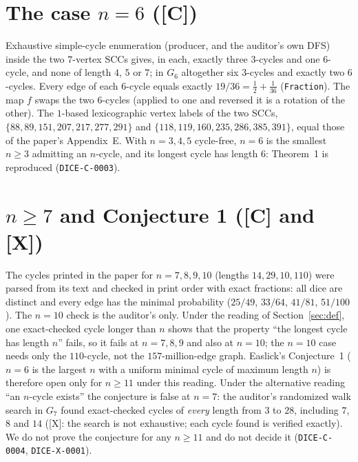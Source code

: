 \documentclass[10pt]{article}
\newcommand{\tier}[1]{\textsf{[#1]}}
\newcommand{\tC}{\tier{C}}
\newcommand{\tX}{\tier{X}}
\begin{document}
\section{The case $n=6$ (\tC{})}\label{sec:six}
Exhaustive simple-cycle enumeration (producer, and the auditor's own DFS) inside the two $7$-vertex SCCs gives, in each, exactly three $3$-cycles and one $6$-cycle, and none of length $4$, $5$ or $7$; in $G_6$ altogether six $3$-cycles and exactly two $6$-cycles. Every edge of each $6$-cycle equals exactly $19/36=\tfrac12+\tfrac1{36}$ (\texttt{Fraction}). The map $f$ swaps the two $6$-cycles (applied to one and reversed it is a rotation of the other). The $1$-based lexicographic vertex labels of the two SCCs, $\{88,89,151,207,217,277,291\}$ and $\{118,119,160,235,286,385,391\}$, equal those of the paper's Appendix~E. With $n=3,4,5$ cycle-free, $n=6$ is the smallest $n\ge3$ admitting an $n$-cycle, and its longest cycle has length $6$: Theorem~1 is reproduced (\texttt{DICE-C-0003}).

\section{$n\ge7$ and Conjecture 1 (\tC{} and \tX{})}\label{sec:big}
The cycles printed in the paper for $n=7,8,9,10$ (lengths $14,29,10,110$) were parsed from its text and checked in print order with exact fractions: all dice are distinct and every edge has the minimal probability ($25/49$, $33/64$, $41/81$, $51/100$). The $n=10$ check is the auditor's only. Under the reading of Section~\ref{sec:def}, one exact-checked cycle longer than $n$ shows that the property ``the longest cycle has length $n$'' fails, so it fails at $n=7,8,9$ and also at $n=10$; the $n=10$ case needs only the $110$-cycle, not the $157$-million-edge graph. Easlick's Conjecture~1 ($n=6$ is the largest $n$ with a uniform minimal cycle of maximum length $n$) is therefore open only for $n\ge11$ under this reading. Under the alternative reading ``an $n$-cycle exists'' the conjecture is false at $n=7$: the auditor's randomized walk search in $G_7$ found exact-checked cycles of \emph{every} length from $3$ to $28$, including $7$, $8$ and $14$ (\tX{}: the search is not exhaustive; each cycle found is verified exactly). We do not prove the conjecture for any $n\ge11$ and do not decide it (\texttt{DICE-C-0004}, \texttt{DICE-X-0001}).
\end{document}
